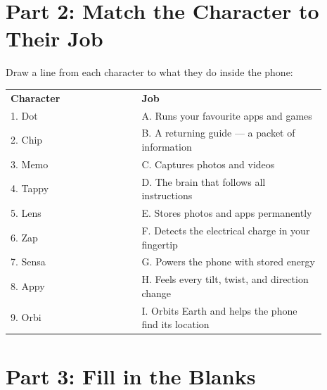 \vspace{12pt}

\section*{Part 2: Match the Character to Their Job}

\begin{tcolorbox}[enhanced,colback=WarmOrange!8,colframe=WarmOrange,arc=6pt,boxrule=1pt,
  left=10pt,right=10pt,top=8pt,bottom=8pt]

Draw a line from each character to what they do inside the phone:

\begin{center}
\begin{tabular}{p{0.32\linewidth}p{0.05\linewidth}p{0.52\linewidth}}
\textbf{Character} & & \textbf{Job} \\[8pt]
1. Dot   & & A. Runs your favourite apps and games \\[6pt]
2. Chip  & & B. A returning guide — a packet of information \\[6pt]
3. Memo  & & C. Captures photos and videos \\[6pt]
4. Tappy & & D. The brain that follows all instructions \\[6pt]
5. Lens  & & E. Stores photos and apps permanently \\[6pt]
6. Zap   & & F. Detects the electrical charge in your fingertip \\[6pt]
7. Sensa & & G. Powers the phone with stored energy \\[6pt]
8. Appy  & & H. Feels every tilt, twist, and direction change \\[6pt]
9. Orbi  & & I. Orbits Earth and helps the phone find its location \\[6pt]
\end{tabular}
\end{center}
\end{tcolorbox}

\vspace{12pt}

\section*{Part 3: Fill in the Blanks}

